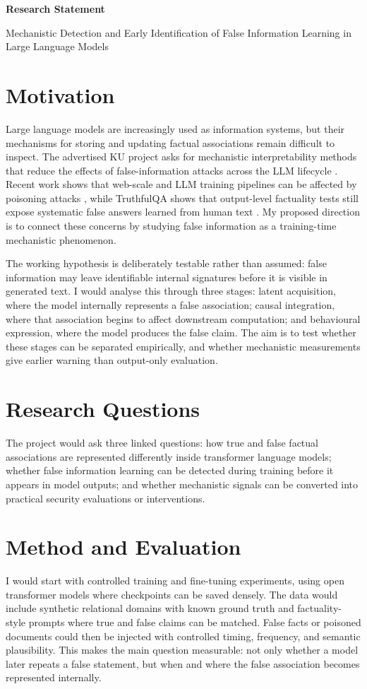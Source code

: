 \documentclass[10pt,a4paper]{article}
\newcommand{\statementtitle}[1]{%
  \begin{center}
    {\Large\bfseries #1}
  \end{center}
}
\newcommand{\statementsubtitle}[1]{%
  \begin{center}
    {\normalsize #1}
  \end{center}
  \vspace{0.5em}
}
\begin{document}
\statementtitle{Research Statement}
\statementsubtitle{Mechanistic Detection and Early Identification of False Information Learning in Large Language Models}

\section{Motivation}
Large language models are increasingly used as information systems, but their mechanisms for storing and updating factual associations remain difficult to inspect. The advertised KU project asks for mechanistic interpretability methods that reduce the effects of false-information attacks across the LLM lifecycle \cite{ku2026mechanisticllmsecurity}. Recent work shows that web-scale and LLM training pipelines can be affected by poisoning attacks \cite{carlini2023poisoning,souly2025poisoning}, while TruthfulQA shows that output-level factuality tests still expose systematic false answers learned from human text \cite{lin2022truthfulqa}. My proposed direction is to connect these concerns by studying false information as a training-time mechanistic phenomenon.

\hspace*{2em}
The working hypothesis is deliberately testable rather than assumed: false information may leave identifiable internal signatures before it is visible in generated text. I would analyse this through three stages: latent acquisition, where the model internally represents a false association; causal integration, where that association begins to affect downstream computation; and behavioural expression, where the model produces the false claim. The aim is to test whether these stages can be separated empirically, and whether mechanistic measurements give earlier warning than output-only evaluation.

\section{Research Questions}
The project would ask three linked questions: how true and false factual associations are represented differently inside transformer language models; whether false information learning can be detected during training before it appears in model outputs; and whether mechanistic signals can be converted into practical security evaluations or interventions.

\section{Method and Evaluation}
I would start with controlled training and fine-tuning experiments, using open transformer models where checkpoints can be saved densely. The data would include synthetic relational domains with known ground truth and factuality-style prompts where true and false claims can be matched. False facts or poisoned documents could then be injected with controlled timing, frequency, and semantic plausibility. This makes the main question measurable: not only whether a model later repeats a false statement, but when and where the false association becomes represented internally.
\end{document}
